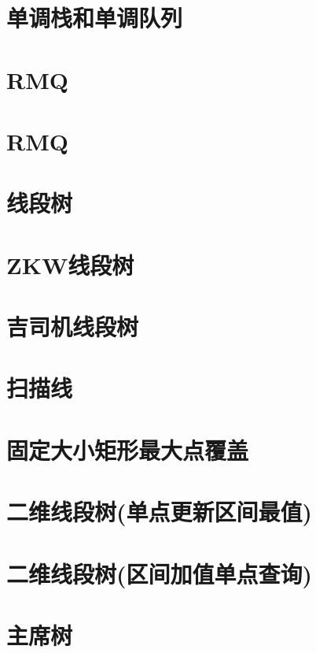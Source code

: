 \section{单调栈和单调队列}
\raggedbottom
\hrulefill
\section{RMQ}
\raggedbottom
\hrulefill
\section{RMQ}
\raggedbottom
\hrulefill
\section{线段树}
\raggedbottom
\hrulefill
\section{ZKW线段树}
\raggedbottom
\hrulefill
\section{吉司机线段树}
\raggedbottom
\hrulefill
\section{扫描线}
\raggedbottom
\hrulefill
\section{固定大小矩形最大点覆盖}
\raggedbottom
\hrulefill
\section{二维线段树(单点更新区间最值)}
\raggedbottom
\hrulefill
\section{二维线段树(区间加值单点查询)}
\raggedbottom
\hrulefill
\section{主席树}
\raggedbottom
\hrulefill

